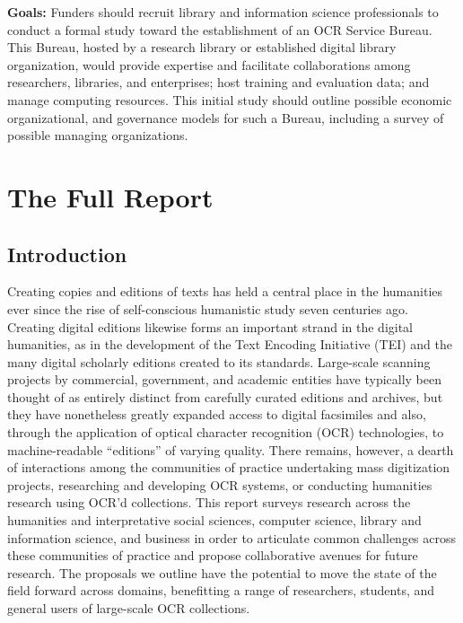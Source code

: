 \documentclass[twoside,11pt]{report}
\begin{document}
\begin{enumerate}
\textbf{Goals:} Funders should recruit library and information science professionals to conduct a formal study toward the establishment of an OCR Service Bureau. This Bureau, hosted by a research library or established digital library organization, would provide expertise and facilitate collaborations among researchers, libraries, and enterprises; host training and evaluation data; and manage computing resources. This initial study should outline possible economic organizational, and governance models for such a Bureau, including a survey of possible managing organizations.

\end{enumerate}

\chapter{The Full Report}

\section{Introduction}

Creating copies and editions of texts has held a central place in the humanities ever since the rise of self-conscious humanistic study seven centuries ago. Creating digital editions likewise forms an important strand in the digital humanities, as in the development of the Text Encoding Initiative (TEI) and the many digital scholarly editions created to its standards. Large-scale scanning projects by commercial, government, and academic entities have typically been thought of as entirely distinct from carefully curated editions and archives, but they have nonetheless greatly expanded access to digital facsimiles and also, through the application of optical character recognition (OCR) technologies, to machine-readable ``editions'' of varying quality. There remains, however, a dearth of interactions among the communities of practice undertaking mass digitization projects, researching and developing OCR systems, or conducting humanities research using OCR'd collections. This report surveys research across the humanities and interpretative social sciences, computer science, library and information science, and business in order to articulate common challenges across these communities of practice and propose collaborative avenues for future research. The proposals we outline have the potential to move the state of the field forward across domains, benefitting a range of researchers, students, and general users of large-scale OCR collections.
\end{document}
